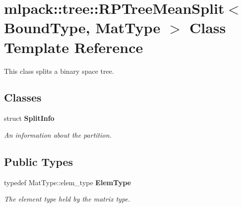 \section{mlpack\+:\+:tree\+:\+:R\+P\+Tree\+Mean\+Split$<$ Bound\+Type, Mat\+Type $>$ Class Template Reference}
\label{classmlpack_1_1tree_1_1RPTreeMeanSplit}


This class splits a binary space tree.  


\subsection*{Classes}
\begin{DoxyCompactItemize}
\item 
struct {\bf Split\+Info}
\begin{DoxyCompactList}\small\item\em An information about the partition. \end{DoxyCompactList}\end{DoxyCompactItemize}
\subsection*{Public Types}
\begin{DoxyCompactItemize}
\item 
typedef Mat\+Type\+::elem\+\_\+type {\bf Elem\+Type}
\begin{DoxyCompactList}\small\item\em The element type held by the matrix type. \end{DoxyCompactList}\end{DoxyCompactItemize}
